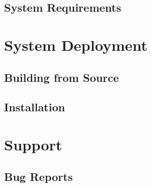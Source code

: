 

\section{System Requirements}
\label{section:systemrequirements}


\chapter{System Deployment}
\label{chapter:deployment}
\section{Building from Source}
\label{section:buildingfromsource}

\section{Installation}
\label{section:installation}


\chapter{Support}
\label{chapter:support}


\section{Bug Reports}
\label{section:bugreports}


